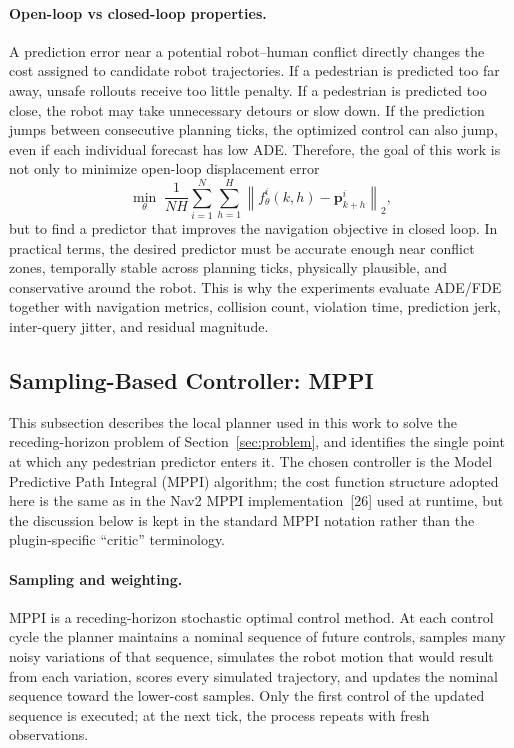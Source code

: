 \documentclass[12pt, a4paper]{article}
\begin{document}
\paragraph{Open-loop vs closed-loop properties.} A prediction error near a potential robot--human conflict directly changes the cost assigned to candidate robot trajectories. If a pedestrian is predicted too far away, unsafe rollouts receive too little penalty. If a pedestrian is predicted too close, the robot may take unnecessary detours or slow down. If the prediction jumps between consecutive planning ticks, the optimized control can also jump, even if each individual forecast has low ADE. Therefore, the goal of this work is not only to minimize open-loop displacement error
\[
\min_{\theta}\;
\frac{1}{NH}
\sum_{i=1}^{N}\sum_{h=1}^{H}
\left\|
f_{\theta}^{i}(k,h)-\mathbf{p}^{i}_{k+h}
\right\|_2,
\]
but to find a predictor that improves the navigation objective in closed loop. In practical terms, the desired predictor must be accurate enough near conflict zones, temporally stable across planning ticks, physically plausible, and conservative around the robot. This is why the experiments evaluate ADE/FDE together with navigation metrics, collision count, violation time, prediction jerk, inter-query jitter, and residual magnitude.

\subsection{Sampling-Based Controller: MPPI}
\label{sec:mppi-cost}

This subsection describes the local planner used in this work to solve the receding-horizon problem of Section~\ref{sec:problem}, and identifies the single point at which any pedestrian predictor enters it. The chosen controller is the Model Predictive Path Integral (MPPI) algorithm; the cost function structure adopted here is the same as in the Nav2 MPPI implementation~[26] used at runtime, but the discussion below is kept in the standard MPPI notation rather than the plugin-specific ``critic'' terminology.

\paragraph{Sampling and weighting.} MPPI is a receding-horizon stochastic optimal control method. At each control cycle the planner maintains a nominal sequence of future controls, samples many noisy variations of that sequence, simulates the robot motion that would result from each variation, scores every simulated trajectory, and updates the nominal sequence toward the lower-cost samples. Only the first control of the updated sequence is executed; at the next tick, the process repeats with fresh observations.
\end{document}
